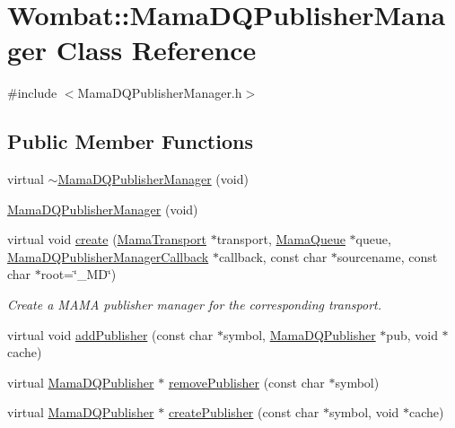 \hypertarget{classWombat_1_1MamaDQPublisherManager}{
\section{Wombat::MamaDQPublisherManager Class Reference}
\label{classWombat_1_1MamaDQPublisherManager}
}


{\ttfamily \#include $<$MamaDQPublisherManager.h$>$}\subsection*{Public Member Functions}
\begin{DoxyCompactItemize}
\item 
virtual \hyperlink{classWombat_1_1MamaDQPublisherManager_a539ac8604357815413cb39fe5b584851}{$\sim$MamaDQPublisherManager} (void)
\item 
\hyperlink{classWombat_1_1MamaDQPublisherManager_a4c064265c256a1820951fecd676a6377}{MamaDQPublisherManager} (void)
\item 
virtual void \hyperlink{classWombat_1_1MamaDQPublisherManager_ac25a92885d801ba9fdc8bc72c443ab8d}{create} (\hyperlink{classWombat_1_1MamaTransport}{MamaTransport} $\ast$transport, \hyperlink{classWombat_1_1MamaQueue}{MamaQueue} $\ast$queue, \hyperlink{classWombat_1_1MamaDQPublisherManagerCallback}{MamaDQPublisherManagerCallback} $\ast$callback, const char $\ast$sourcename, const char $\ast$root=\char`\"{}\_\-MD\char`\"{})
\begin{DoxyCompactList}\small\item\em Create a MAMA publisher manager for the corresponding transport. \item\end{DoxyCompactList}\item 
virtual void \hyperlink{classWombat_1_1MamaDQPublisherManager_aa31e692c0fba2a19eea1632d6f30f664}{addPublisher} (const char $\ast$symbol, \hyperlink{classWombat_1_1MamaDQPublisher}{MamaDQPublisher} $\ast$pub, void $\ast$cache)
\item 
virtual \hyperlink{classWombat_1_1MamaDQPublisher}{MamaDQPublisher} $\ast$ \hyperlink{classWombat_1_1MamaDQPublisherManager_ade73b545253cfdf39cebc1ded7ea5a75}{removePublisher} (const char $\ast$symbol)
\item 
virtual \hyperlink{classWombat_1_1MamaDQPublisher}{MamaDQPublisher} $\ast$ \hyperlink{classWombat_1_1MamaDQPublisherManager_a9ba42534979a3c0e7dce553e2933c2b8}{createPublisher} (const char $\ast$symbol, void $\ast$cache)

\end{DoxyCompactItemize}
